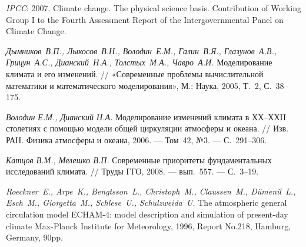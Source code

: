 \begin{thebibliography}{500}

\emph{IPCC}: 2007. Climate change. The physical science basis. Contribution of Working Group I to the Fourth Assessment Report of the Intergovernmental Panel on Climate Change.

\emph{Дымников~В.П., Лыкосов~В.Н., Володин~Е.М., Галин~В.Я., Глазунов~А.В., Грицун~А.С., Дианский~Н.А., Толстых~М.А., Чавро~А.И.} Моделирование климата и его изменений. // «Современные проблемы вычислительной математики и математического моделирования», М.: Наука, 2005, Т.~2, С.~38--175.

\emph{Володин Е.М., Дианский Н.А.} Моделирование изменений климата в ХХ--ХХII столетиях с помощью модели общей циркуляции атмосферы и океана. // Изв. РАН. Физика атмосферы и океана, 2006. --- Том~42, №3. --- С.~291--306.

\emph{Катцов В.М., Мелешко В.П.} Современные приоритеты фундаментальных исследований климата. // Труды ГГО, 2008. --- вып.~557. --- С.~3--19.

\emph{Roeckner~E., Arpe~K., Bengtsson~L., Christoph~M., Claussen~M., Dümenil~L., Esch~M., Giorgetta~M., Schlese~U., Schulzweida~U.} The atmospheric general circulation model ECHAM-4: model description and simulation of present-day climate Max-Planck Institute for Meteorology, 1996, Report No.218, Hamburg, Germany, 90pp.
\end{thebibliography}
